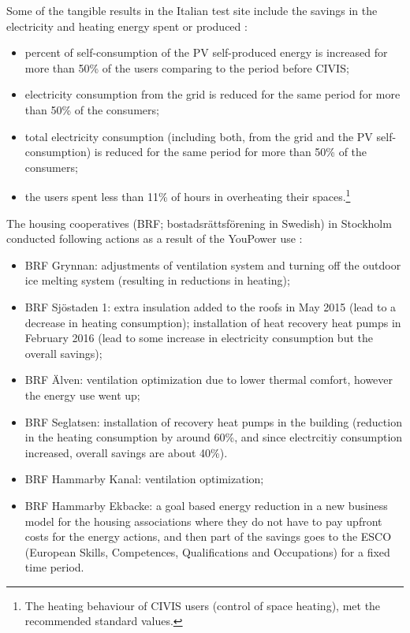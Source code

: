 Some of the tangible results in the Italian test site include the savings in the electricity and heating energy spent or produced \cite{civics}:
\begin{itemize}
	\setlength{\itemsep}{0mm}
	\item percent	of	self-consumption	of	 the	PV	self-produced energy	 is	 increased	 for more than	50\% of the	users	comparing	to	the period before CIVIS;
	\item electricity	consumption	from the	grid	is	reduced for the same period for	more than	50\% of the	consumers;	
	\item 	total	 electricity	 consumption	 (including both, from	the grid	 and	the PV	 self-consumption)		is	reduced for the same period for	more than	50\% of the	consumers;	
	\item  the users spent less than 11\% of hours in overheating their spaces.\footnote{The	heating behaviour	 of	 CIVIS	 users (control	 of	 space	 heating),	 met	 the	recommended	standard	values.}
\end{itemize}

The housing cooperatives (BRF; bostadsr\"attsf\"orening	in	Swedish) in Stockholm conducted following actions as a result of the YouPower use \cite{civics}:

\begin{itemize}
	\setlength{\itemsep}{0mm}
	\item BRF	Grynnan: adjustments of	ventilation	system and	turning	off	the	outdoor	ice	melting	system (resulting in	reductions	in	heating);
	\item BRF	 Sj\"ostaden	 1: extra	 insulation	 added	 to	 the	 roofs in	May	2015	(lead	to	a	decrease	in	heating	consumption);	 installation	 of	 heat	 recovery	 heat	 pumps	 in	 February	 2016 (lead	 to	 some	 increase	 in	 electricity	 consumption	 but	 the	 overall	savings);
	\item BRF	\"Alven: ventilation	optimization due to lower thermal comfort,	however	the	energy	use	went	up;
	\item BRF	 Seglatsen: installation of recovery	heat	pumps	in	 the	building (reduction in	 the	heating	consumption	by	around	60\%, and since electrcitiy consumption increased, overall savings are	about	40\%).	
	\item BRF	 Hammarby	 Kanal:	 ventilation optimization;
	\item BRF	 Hammarby	 Ekbacke: a goal	 based	 energy	 reduction in	a	new	business	model	for	the	housing	associations	where	 they do not	 have	 to	 pay upfront	costs	for	the energy 	actions, and then part	of	the	savings	goes to	the	 ESCO (European Skills, Competences, Qualifications and Occupations)	 for	 a	 fixed	 time	 period.	
\end{itemize}


